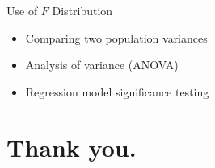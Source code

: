 \documentclass[12pt, aspectratio=169]{beamer}
\begin{document}
    \begin{frame}{Use of \(F\) Distribution}
        \begin{itemize}
            \item Comparing two population variances
            \item Analysis of variance (ANOVA)
            \item Regression model significance testing
        \end{itemize}
    \end{frame}



    \section*{Thank you.}
\end{document}
